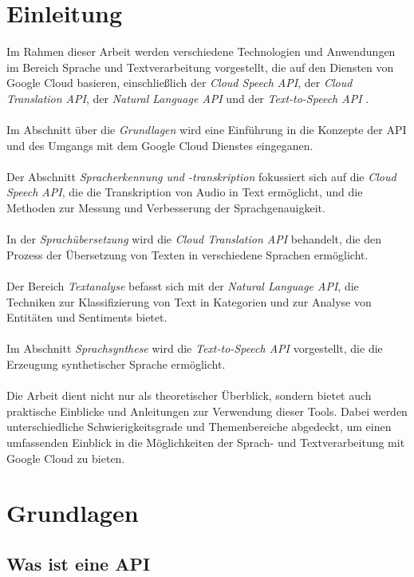 \documentclass[12pt,a4paper]{article}
\begin{document}
\section*{Einleitung}
Im Rahmen dieser Arbeit werden verschiedene Technologien und Anwendungen im Bereich Sprache und Textverarbeitung vorgestellt, die auf den Diensten von Google Cloud basieren, einschließlich der \textit{Cloud Speech API}, der \textit{Cloud Translation API}, der \textit{Natural Language API} und der \textit{Text-to-Speech API} \cite{google}.
\\ \\
Im Abschnitt über die \textit{Grundlagen} wird eine Einführung in die Konzepte der API und des Umgangs mit dem Google Cloud Dienstes eingeganen.
\\ \\
Der Abschnitt \textit{Spracherkennung und -transkription} fokussiert sich auf die \textit{Cloud Speech API}, die die Transkription von Audio in Text ermöglicht, und die Methoden zur Messung und Verbesserung der Sprachgenauigkeit.
\\ \\
In der \textit{Sprachübersetzung} wird die \textit{Cloud Translation API} behandelt, die den Prozess der Übersetzung von Texten in verschiedene Sprachen ermöglicht.
\\ \\
Der Bereich \textit{Textanalyse} befasst sich mit der \textit{Natural Language API}, die Techniken zur Klassifizierung von Text in Kategorien und zur Analyse von Entitäten und Sentiments bietet.
\\ \\
Im Abschnitt \textit{Sprachsynthese} wird die \textit{Text-to-Speech API} vorgestellt, die die Erzeugung synthetischer Sprache ermöglicht.
\\ \\
Die Arbeit dient nicht nur als theoretischer Überblick, sondern bietet auch praktische Einblicke und Anleitungen zur Verwendung dieser Tools. Dabei werden unterschiedliche Schwierigkeitsgrade und Themenbereiche abgedeckt, um einen umfassenden Einblick in die Möglichkeiten der Sprach- und Textverarbeitung mit Google Cloud zu bieten.

	
\newpage

\section{Grundlagen}
\subsection{Was ist eine API}
\end{document}
